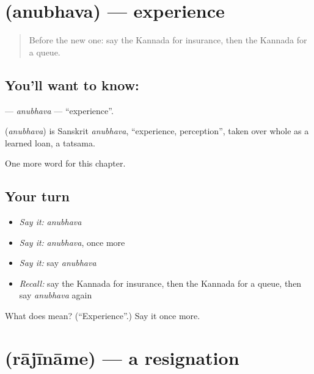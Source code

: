 \section[\texorpdfstring{\kn{ಅನುಭವ} (anubhava)}{ಅನುಭವ (anubhava)}]{ (anubhava) — experience}

\label{lesson:KA-C232-anubhava}



\begin{quote}
Before the new one: say the Kannada for insurance, then the Kannada for a queue.
\end{quote}

\subsection*{You'll want to know: }
\textbf{} — \emph{anubhava} — \textquotedblleft{}experience\textquotedblright{}.

\begin{cousinweb}
\textbf{} (\emph{anubhava}) is Sanskrit \emph{anubhava}, \textquotedblleft{}experience, perception\textquotedblright{}, taken over whole as a learned loan, a tatsama.
\end{cousinweb}

\begin{grammarlens}[title={What you've built}]
One more word for this chapter.
\end{grammarlens}

\subsection*{Your turn}
\begin{itemize}
\raggedright
  \item \emph{Say it:} \emph{anubhava}
  \item \emph{Say it:} \emph{anubhava}, once more
  \item \emph{Say it:} say \emph{anubhava}
  \item \emph{Recall:} say the Kannada for insurance, then the Kannada for a queue, then say \emph{anubhava} again
\end{itemize}

\begin{tcolorbox}[breakable,colback=teal!4,colframe=teal!35!black,title={Before you move on}]
What does  mean? (\textquotedblleft{}Experience\textquotedblright{}.) Say it once more.
\end{tcolorbox}
\section[\texorpdfstring{\kn{ರಾಜೀನಾಮೆ} (rājīnāme)}{ರಾಜೀನಾಮೆ (rājīnāme)}]{ (rājīnāme) — a resignation}

